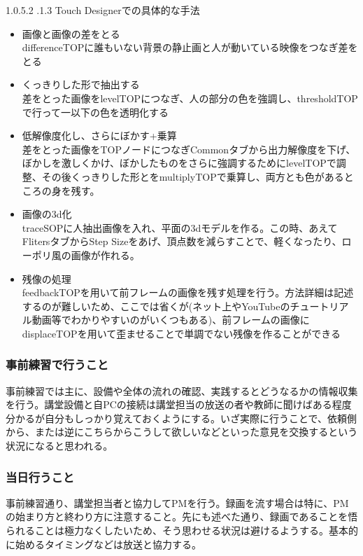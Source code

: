 \documentclass[dvipdfmx,jb5]{jarticle}
\makeatletter
\newcommand{\subsubsubsection}{\@startsection{paragraph}{4}{\z@}%
    {1.0\Cvs \@plus.5\Cdp \@minus.2\Cdp}%
    {.1\Cvs \@plus.3\Cdp}%
    {\reset@font}
  }
\makeatother
\begin{document}
\subsubsubsection{Touch Designerでの具体的な手法}
\begin{itemize}
\item 画像と画像の差をとる\\
differenceTOPに誰もいない背景の静止画と人が動いている映像をつなぎ差をとる
\item くっきりした形で抽出する\\
差をとった画像をlevelTOPにつなぎ、人の部分の色を強調し、thresholdTOPで行って一以下の色を透明化する
\item 低解像度化し、さらにぼかす+乗算\\
差をとった画像をTOPノードにつなぎCommonタブから出力解像度を下げ、ぼかしを激しくかけ、ぼかしたものをさらに強調するためにlevelTOPで調整、その後くっきりした形とをmultiplyTOPで乗算し、両方とも色があるところの身を残す。
\item 画像の3d化\\
traceSOPに人抽出画像を入れ、平面の3dモデルを作る。この時、あえてFlitersタブからStep Sizeをあげ、頂点数を減らすことで、軽くなったり、ローポリ風の画像が作れる。
\item 残像の処理\\
feedbackTOPを用いて前フレームの画像を残す処理を行う。方法詳細は記述するのが難しいため、ここでは省くが(ネット上やYouTubeのチュートリアル動画等でわかりやすいのがいくつもある)、前フレームの画像にdisplaceTOPを用いて歪ませることで単調でない残像を作ることができる
\end{itemize}

\subsubsection{事前練習で行うこと}
事前練習では主に、設備や全体の流れの確認、実践するとどうなるかの情報収集を行う。講堂設備と自PCの接続は講堂担当の放送の者や教師に聞けばある程度分かるが自分もしっかり覚えておくようにする。いざ実際に行うことで、依頼側から、または逆にこちらからこうして欲しいなどといった意見を交換するという状況になると思われる。

\subsubsection{当日行うこと}
事前練習通り、講堂担当者と協力してPMを行う。録画を流す場合は特に、PMの始まり方と終わり方に注意すること。先にも述べた通り、録画であることを悟られることは極力なくしたいため、そう思わせる状況は避けるようする。基本的に始めるタイミングなどは放送と協力する。
\end{document}
